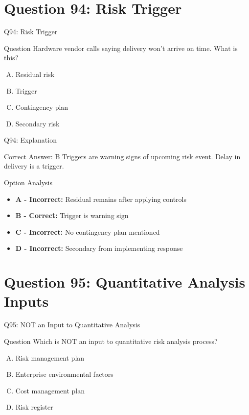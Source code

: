 \documentclass{beamer}
\begin{document}
	\section{Question 94: Risk Trigger}
	
	\begin{frame}{Q94: Risk Trigger}
		\begin{block}{Question}
			Hardware vendor calls saying delivery won't arrive on time. What is this?
		\end{block}
		\begin{enumerate}[(A)]
			\item Residual risk
			\item Trigger
			\item Contingency plan
			\item Secondary risk
		\end{enumerate}
	\end{frame}
	
	\begin{frame}{Q94: Explanation}
		\begin{block}{Correct Answer: B}
			Triggers are warning signs of upcoming risk event. Delay in delivery is a trigger.
		\end{block}
		\begin{block}{Option Analysis}
			\begin{itemize}
				\item \textbf{A - Incorrect:} Residual remains after applying controls
				\item \textbf{B - Correct:} Trigger is warning sign
				\item \textbf{C - Incorrect:} No contingency plan mentioned
				\item \textbf{D - Incorrect:} Secondary from implementing response
			\end{itemize}
		\end{block}
	\end{frame}
	
	\section{Question 95: Quantitative Analysis Inputs}
	
	\begin{frame}{Q95: NOT an Input to Quantitative Analysis}
		\begin{block}{Question}
			Which is NOT an input to quantitative risk analysis process?
		\end{block}
		\begin{enumerate}[(A)]
			\item Risk management plan
			\item Enterprise environmental factors
			\item Cost management plan
			\item Risk register
		\end{enumerate}
	\end{frame}
	
\end{document}
